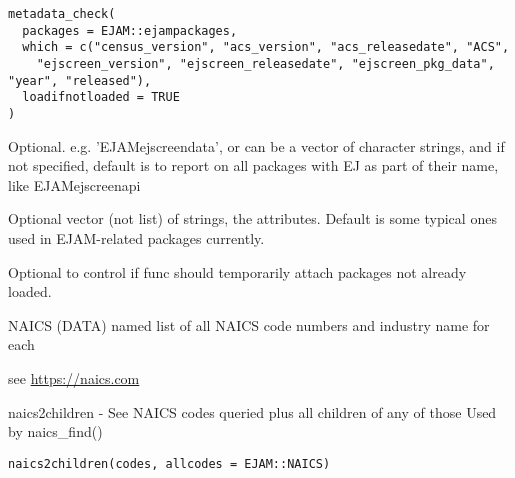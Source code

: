 \documentclass[a4paper]{book}
\begin{document}
%
\begin{Usage}
\begin{verbatim}
metadata_check(
  packages = EJAM::ejampackages,
  which = c("census_version", "acs_version", "acs_releasedate", "ACS",
    "ejscreen_version", "ejscreen_releasedate", "ejscreen_pkg_data", "year", "released"),
  loadifnotloaded = TRUE
)
\end{verbatim}
\end{Usage}
%
\begin{Arguments}
\begin{ldescription}
\item[\code{packages}] Optional. e.g. 'EJAMejscreendata', or can be a vector of character strings,
and if not specified, default is to report on all packages with EJ as part of their name,
like EJAMejscreenapi

\item[\code{which}] Optional vector (not list) of strings, the attributes.
Default is some typical ones used in EJAM-related packages currently.

\item[\code{loadifnotloaded}] Optional to control if func should temporarily attach packages not already loaded.
\end{ldescription}
\end{Arguments}
%
\begin{Description}\relax
NAICS (DATA) named list of all NAICS code numbers and industry name for each
\end{Description}
%
\begin{Details}\relax
see \url{https://naics.com}
\end{Details}
%
\begin{SeeAlso}\relax
{}   
\end{SeeAlso}
%
\begin{Description}\relax
naics2children - See NAICS codes queried plus all children of any of those
Used by naics\_find()
\end{Description}
%
\begin{Usage}
\begin{verbatim}
naics2children(codes, allcodes = EJAM::NAICS)
\end{verbatim}
\end{Usage}
\end{document}
